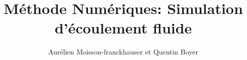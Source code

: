 \documentclass{article}
\begin{document}
\title{Méthode Numériques: Simulation d'écoulement fluide}
\author{Aurélien Moisson-franckhauser et Quentin Boyer}
\maketitle
\end{document}
